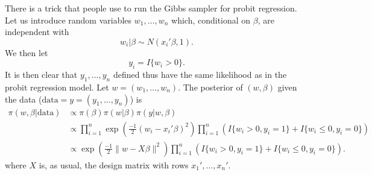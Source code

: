 \documentclass{scrartcl}
\begin{document}
  There is a trick that people use to run the Gibbs sampler for probit
  regression. Let us introduce random variables $w_1, \dots, w_n$
  which, conditional on $\beta$, are independent with
  \begin{equation*}
   w_i | \beta \sim N(x_i' \beta, 1). 
  \end{equation*}
  We then let
  \begin{equation*}
    y_i = I\{w_i > 0\}. 
  \end{equation*}
  It is then clear that $y_1, \dots, y_n$ defined thus have the same
  likelihood as in the probit regression model. Let $w = (w_1, \dots,
  w_n)$. The posterior of $(w, \beta)$ given the data ($\text{data} =
  y = (y_1, \dots, y_n)$) is
  \begin{align*}
    \pi(w, \beta | \text{data}) &\propto \pi(\beta) \pi(w | \beta)
                                   \pi(y | w, \beta) \\
    &\propto \prod_{i=1}^n \exp \left(\frac{-1}{2} (w_i - x_i'
      \beta)^2\right) \prod_{i=1}^n \left(I\{w_i > 0, y_i = 1\} +
      I\{w_i \leq 0, y_i = 0\} \right) \\
    &\propto \exp \left(\frac{-1}{2} \|w - X \beta\|^2 \right)  \prod_{i=1}^n \left(I\{w_i > 0, y_i = 1\} +
      I\{w_i \leq 0, y_i = 0\} \right). 
  \end{align*}
  where $X$ is, as usual, the design matrix with rows $x_1', \dots,
  x_n'$.
\end{document}
